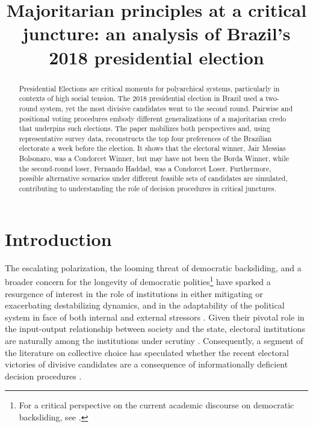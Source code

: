 \documentclass[hidelinks,11pt]{article} \usepackage[utf8]{inputenc}
\title{Majoritarian principles at a critical juncture: an analysis of Brazil's
  2018 presidential election}
\begin{document}
\maketitle
\begin{abstract}
  Presidential Elections are critical moments for polyarchical systems,
  particularly in contexts of high social tension. The 2018 presidential
  election in Brazil used a two-round system, yet the most divisive candidates
  went to the second round. Pairwise and positional voting procedures embody
  different generalizations of a majoritarian credo that underpins such
  elections. The paper mobilizes both perspectives and, using representative
  survey data, reconstructs the top four preferences of the Brazilian electorate
  a week before the election. It shows that the electoral winner, Jair Messias
  Bolsonaro, was a Condorcet Winner, but may have not been the Borda Winner,
  while the second-round loser, Fernando Haddad, was a Condorcet Loser.
  Furthermore, possible alternative scenarios under different feasible sets of
  candidates are simulated, contributing to understanding the role of decision
  procedures in critical junctures.
  \end{abstract}
\section{Introduction}

The escalating polarization, the looming threat of democratic backsliding, and a
broader concern for the longevity of democratic polities\footnote{For a critical
  perspective on the current academic discourse on democratic backsliding, see
  \textcite{little2023subjective}.} have sparked a resurgence of interest in the
role of institutions in either mitigating or exacerbating destabilizing
dynamics, and in the adaptability of the political system in face of
both internal and external stressors \parencite{Bednare2113843118,
  chiopris2021wolf, tarko2014institutional, ostrom1997meaning}. Given their pivotal role in the input-output relationship between society and the state, electoral institutions are naturally among the institutions under scrutiny \parencite{Wange2021systems}. Consequently, a segment of the literature on collective choice has speculated whether the recent electoral victories of divisive candidates are a consequence of informationally deficient decision procedures \parencite{potthoff2021condorcet, kurrild2018trump, woon2020trump}.
\end{document}
